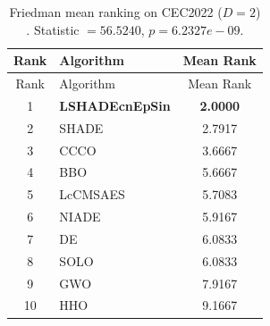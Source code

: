 \begin{center}
\small
\renewcommand{\arraystretch}{1.25}
\begin{longtable}{clc}
\caption{Friedman mean ranking on CEC2022 ($D=2$) . Statistic $=56.5240$, $p=6.2327e-09$.}
\label{tab:friedman_CEC2022_2} \\
\toprule
Rank & Algorithm & Mean Rank \\
\midrule
\endfirsthead
\toprule
Rank & Algorithm & Mean Rank \\
\midrule
\endhead
1 & \textbf{LSHADEcnEpSin} & \textbf{2.0000} \\
2 & SHADE & 2.7917 \\
3 & CCCO & 3.6667 \\
4 & BBO & 5.6667 \\
5 & LcCMSAES & 5.7083 \\
6 & NIADE & 5.9167 \\
7 & DE & 6.0833 \\
8 & SOLO & 6.0833 \\
9 & GWO & 7.9167 \\
10 & HHO & 9.1667 \\
\bottomrule
\end{longtable}
\end{center}